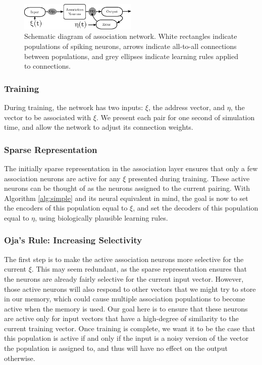 \documentclass[10pt,letterpaper]{article}
\begin{document}
\begin{figure}[b]
\begin{center}
\includegraphics[width=0.5\textwidth]{../diagrams/schematic.pdf}
\end{center}
\caption{Schematic diagram of association network. White rectangles indicate populations of spiking neurons, arrows indicate all-to-all connections between populations, and grey ellipses indicate learning rules applied to connections.}
\label{fig:schematic}
\end{figure}
\subsubsection{Training}
During training, the network has two inputs: $\xi$, the address vector, and $\eta$, the vector to be associated with $\xi$. We present each pair for one second of simulation time, and allow the network to adjust its connection weights.

\subsubsection{Sparse Representation}
The initially sparse representation in the association layer ensures that only a few association neurons are active for any $\xi$ presented during training. These active neurons can be thought of as the neurons assigned to the current pairing. With Algorithm \ref{alg:simple} and its neural equivalent in mind, the goal is now to set the encoders of this population equal to $\xi$, and set the decoders of this population equal to $\eta$, using biologically plausible learning rules. 

\subsubsection{Oja's Rule: Increasing Selectivity}
The first step is to make the active association neurons more selective for the current $\xi$. This may seem redundant, as the sparse representation ensures that the neurons are already fairly selective for the current input vector. However, those active neurons will also respond to other vectors that we might try to store in our memory, which could cause multiple association populations to become active when the memory is used. Our goal here is to ensure that these neurons are active only for input vectors that have a high-degree of similarity to the current training vector. Once training is complete, we want it to be the case that this population is active if and only if the input is a noisy version of the vector the population is assigned to, and thus will have no effect on the output otherwise.
\end{document}
